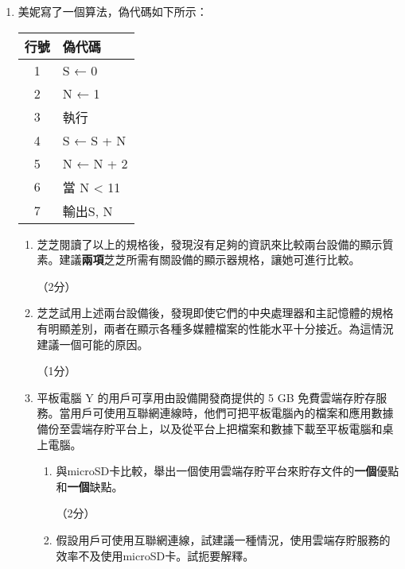 \documentclass[12pt,a4paper]{article}
\newcommand{\answerline}[1]{\underline{\hspace{#1}}}
\begin{document}
\begin{enumerate}

\item 美妮寫了一個算法，偽代碼如下所示：

\begin{center}
\begin{tabular}{|c|l|}
\hline
\textbf{行號} & \textbf{偽代碼} \\
\hline
1 & S ← 0 \\
\hline
2 & N ← 1 \\
\hline
3 & 執行 \\
\hline
4 & S ← S + N \\
\hline
5 & N ← N + 2 \\
\hline
6 & 當 N < 11 \\
\hline
7 & 輸出S, N \\
\hline
\end{tabular}
\end{center}

\begin{enumerate}[label=(\alph*)]
\item 芝芝閱讀了以上的規格後，發現沒有足夠的資訊來比較兩台設備的顯示質素。建議\textbf{兩項}芝芝所需有關設備的顯示器規格，讓她可進行比較。

\answerline{15cm}

\answerline{15cm} （2分）

\item 芝芝試用上述兩台設備後，發現即使它們的中央處理器和主記憶體的規格有明顯差別，兩者在顯示各種多媒體檔案的性能水平十分接近。為這情況建議一個可能的原因。

\answerline{15cm} （1分）

\item 平板電腦 Y 的用戶可享用由設備開發商提供的 5 GB 免費雲端存貯存服務。當用戶可使用互聯網連線時，他們可把平板電腦內的檔案和應用數據備份至雲端存貯平台上，以及從平台上把檔案和數據下載至平板電腦和桌上電腦。

\begin{enumerate}[label=(\roman*)]
\item 與microSD卡比較，舉出一個使用雲端存貯平台來貯存文件的\textbf{一個}優點和\textbf{一個}缺點。

\answerline{15cm}

\answerline{15cm}

\answerline{15cm} （2分）

\item 假設用戶可使用互聯網連線，試建議一種情況，使用雲端存貯服務的效率不及使用microSD卡。試扼要解釋。


\end{enumerate}
\end{enumerate}
\end{enumerate}
\end{document}
